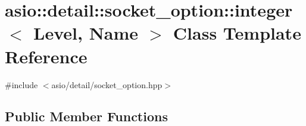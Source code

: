 \hypertarget{classasio_1_1detail_1_1socket__option_1_1integer}{}\section{asio\+:\+:detail\+:\+:socket\+\_\+option\+:\+:integer$<$ Level, Name $>$ Class Template Reference}
\label{classasio_1_1detail_1_1socket__option_1_1integer}


{\ttfamily \#include $<$asio/detail/socket\+\_\+option.\+hpp$>$}

\subsection*{Public Member Functions}

